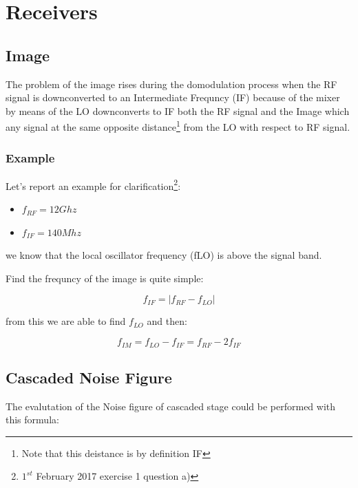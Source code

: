 \chapter{Receivers} %
\label{cha:receivers}


\section{Image} %
\label{sec:image}

The problem of the image rises during the domodulation process when the RF signal is downconverted to an Intermediate Frequncy (IF) because of the mixer by means of the LO downconverts to IF both the RF signal and the Image which any signal at the same opposite distance\footnote{Note that this deistance is by definition IF} from the LO with respect to RF signal.

\subsection*{Example} %
\label{sub:example}

Let's report an example for clarification\footnote{$1^{st}$ February 2017 exercise 1 question a)}:
\begin{itemize}
	\item $f_{RF}= 12 Ghz$ 
	\item $f_{IF}= 140 Mhz$ 
\end{itemize}

we know that the local oscillator frequency (fLO) is above the signal band.

Find the frequncy of the image is quite simple:


\begin{equation}
	f_{IF}=|f_{RF}-f_{LO}|
\end{equation}

from this we are able to find $f_{LO}$ and then:

\begin{equation}
		f_{IM}=f_{LO}-f_{IF}= f_{RF}-2f_{IF}
\end{equation}


\section{Cascaded Noise Figure} %
\label{sec:cascaded_noise_figure}

The evalutation of the Noise figure of cascaded stage could be performed with this formula:

